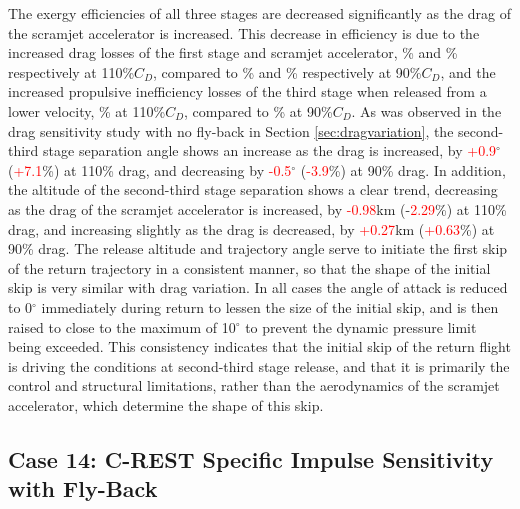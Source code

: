 The exergy efficiencies of all three stages are decreased significantly as the drag of the scramjet accelerator is increased. This decrease in efficiency is due to the increased drag losses of the first stage and scramjet accelerator, \WDoneCdOneHundredTen\% and \WDsecondCdOneHundredTen\% respectively at 110\%$C_D$, compared to \WDoneCdNinety\% and \WDsecondCdNinety\% respectively at 90\%$C_D$, and the increased propulsive inefficiency losses of the third stage when released from a lower velocity, \PlossthreeCdOneHundredTen\% at 110\%$C_D$, compared to \PlossthreeCdNinety \% at 90\%$C_D$.
As was observed in the drag sensitivity study with no fly-back in Section \ref{sec:dragvariation}, the second-third stage separation angle shows an increase as the drag is increased, by \textcolor{red}{+0.9}$^\circ$ (\textcolor{red}{+7.1}\%) at 110\% drag, and decreasing by \textcolor{red}{-0.5}$^\circ$ (\textcolor{red}{-3.9}\%) at 90\% drag. In addition, the altitude of the second-third stage separation shows a clear trend, decreasing as the drag of the scramjet accelerator is increased, by \textcolor{red}{-0.98}km (-\textcolor{red}{2.29}\%) at 110\% drag, and increasing slightly as the drag is decreased, by \textcolor{red}{+0.27}km (\textcolor{red}{+0.63}\%) at 90\% drag.  
The release altitude and trajectory angle serve to initiate the first skip of the return trajectory in a consistent manner, so that the shape of the initial skip is very similar with drag variation. In all cases the angle of attack is reduced to 0$^\circ$ immediately during return to lessen the size of the initial skip, and is then raised to close to the maximum of 10$^\circ$ to prevent the dynamic pressure limit being exceeded. This consistency indicates that the initial skip of the return flight is driving the conditions at second-third stage release, and that it is primarily the control and structural limitations, rather than the aerodynamics of the scramjet accelerator, which determine the shape of this skip.


\subsection{Case 14: C-REST Specific Impulse Sensitivity with Fly-Back}



